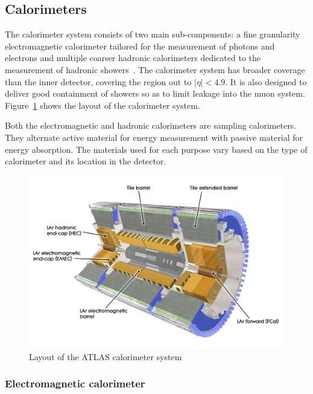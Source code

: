 \subsection{Calorimeters}

The calorimeter system consists of two main sub-components: a fine granularity electromagnetic calorimeter tailored for the measurement of photons and electrons and multiple coarser hadronic calorimeters dedicated to the measurement of hadronic showers~\cite{ATLASPaper}. The calorimeter system has broader coverage than the inner detector, covering the region out to $|\eta| < 4.9$. It is also designed to deliver good containment of showers so as to limit leakage into the muon system. Figure~\ref{fig:ATLAS_calo} shows the layout of the calorimeter system. 

Both the electromagnetic and hadronic calorimeters are sampling calorimeters. They alternate active material for energy measurement with passive material for energy absorption. The materials used for each purpose vary based on the type of calorimeter and its location in the detector. 

\begin{figure}[h!]
  \centering
  \captionsetup{justification=centering}

  \includegraphics[width=\textwidth]{figures/ATLAS_calo}
   \caption{Layout of the ATLAS calorimeter system~\cite{ATLASPaper}}
  \label{fig:ATLAS_calo}
\end{figure}

\subsubsection{Electromagnetic calorimeter}


